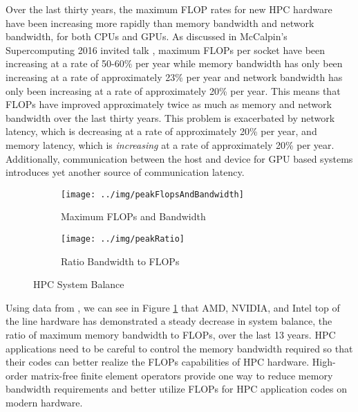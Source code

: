 Over the last thirty years, the maximum FLOP rates for new HPC hardware have been increasing more rapidly than memory bandwidth and network bandwidth, for both CPUs and GPUs.
As discussed in McCalpin's Supercomputing 2016 invited talk \cite{mccalpin2016memory}, maximum FLOPs per socket have been increasing at a rate of 50-60\% per year while memory bandwidth has only been increasing at a rate of approximately 23\% per year and network bandwidth has only been increasing at a rate of approximately 20\% per year.
This means that FLOPs have improved approximately twice as much as memory and network bandwidth over the last thirty years.
This problem is exacerbated by network latency, which is decreasing at a rate of approximately 20\% per year, and memory latency, which is \textit{increasing} at a rate of approximately 20\% per year.
Additionally, communication between the host and device for GPU based systems introduces yet another source of communication latency.

\begin{figure}[ht!]
\begin{subfigure}{.49\textwidth}
\texttt{[image: ../img/peakFlopsAndBandwidth]}
\caption{Maximum FLOPs and Bandwidth}
\end{subfigure}
\begin{subfigure}{.49\textwidth}
\texttt{[image: ../img/peakRatio]}
\caption{Ratio Bandwidth to FLOPs}
\end{subfigure}
\caption{HPC System Balance}
\label{fig:peakratio}
\end{figure}

Using data from \cite{kruppcomparison}, we can see in Figure \ref{fig:peakratio} that AMD, NVIDIA, and Intel top of the line hardware has demonstrated a steady decrease in system balance, the ratio of maximum memory bandwidth to FLOPs, over the last 13 years.
HPC applications need to be careful to control the memory bandwidth required so that their codes can better realize the FLOPs capabilities of HPC hardware.
High-order matrix-free finite element operators provide one way to reduce memory bandwidth requirements and better utilize FLOPs for HPC application codes on modern hardware.